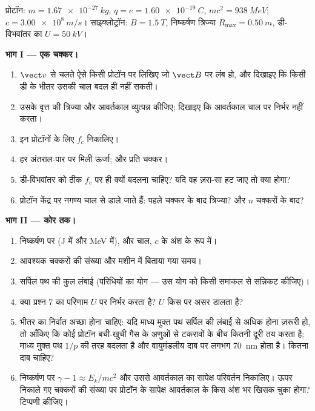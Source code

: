 \begin{problem}
\label{pb:b1:charged-particles:1}
प्रोटॉन: $m = \qty{1.67e-27}{kg}$, $q = e = \qty{1.60e-19}{C}$, $mc^2 =
\qty{938}{MeV}$; $c = \qty{3.00e8}{m/s}$। साइक्लोट्रॉन: $B = \qty{1.5}{T}$,
निष्कर्षण त्रिज्या $R_{\max} = \qty{0.50}{m}$, डी-विभवांतर का 
$U = \qty{50}{kV}$।

\medskip
\noindent\textbf{भाग I --- एक चक्कर।}
\begin{enumerate}
  \item $\vect v$ से चलते ऐसे किसी प्रोटॉन पर  लिखिए जो
        $\vect B$ पर लंब हो, और दिखाइए कि किसी डी के भीतर उसकी चाल बदल ही
        नहीं सकती।
  \item उसके वृत्त की त्रिज्या और आवर्तकाल व्युत्पन्न कीजिए; दिखाइए कि
        आवर्तकाल चाल पर निर्भर नहीं करता।
  \item इन प्रोटॉनों के लिए  $f_c$ निकालिए।
  \item हर अंतराल-पार पर मिली ऊर्जा; और प्रति चक्कर।
  \item डी-विभवांतर को ठीक $f_c$ पर ही क्यों बदलना चाहिए? यदि वह ज़रा-सा
        हट जाए तो क्या होगा?
  \item प्रोटॉन केंद्र पर नगण्य चाल से डाले जाते हैं: पहले चक्कर के बाद
        त्रिज्या? और $n$ चक्करों के बाद?
\end{enumerate}

\medskip
\noindent\textbf{भाग II --- कोर तक।}
\begin{enumerate}[resume]
  \item निष्कर्षण पर  (\unit{J} में और \unit{MeV} में), और चाल, $c$ के अंश के
        रूप में।
  \item आवश्यक चक्करों की संख्या और मशीन में बिताया गया समय।
  \item सर्पिल पथ की कुल लंबाई (परिधियों का योग --- उस योग को किसी समाकल
        से सन्निकट कीजिए)।
  \item क्या प्रश्न 7 का परिणाम $U$ पर निर्भर करता है? $U$ किस पर असर
        डालता है?
  \item भीतर का निर्वात अच्छा होना चाहिए: यदि माध्य मुक्त पथ सर्पिल की
        लंबाई से अधिक होना ज़रूरी हो, तो आँकिए कि कोई प्रोटॉन बची-खुची गैस
        के अणुओं से टकरावों के बीच कितनी दूरी तय करता है; माध्य मुक्त पथ
        $1/p$ की तरह बदलता है और वायुमंडलीय दाब पर लगभग \qty{70}{nm} होता
        है। कितना दाब चाहिए?
  \item निष्कर्षण पर $\gamma - 1 \approx E_k/mc^2$ और उससे आवर्तकाल का
        सापेक्ष परिवर्तन निकालिए। ऊपर निकाले गए चक्करों की संख्या पर
        प्रोटॉन  के सापेक्ष आवर्तकाल के किस अंश भर खिसक चुका
        होगा? टिप्पणी कीजिए।
\end{enumerate}


\end{problem}
